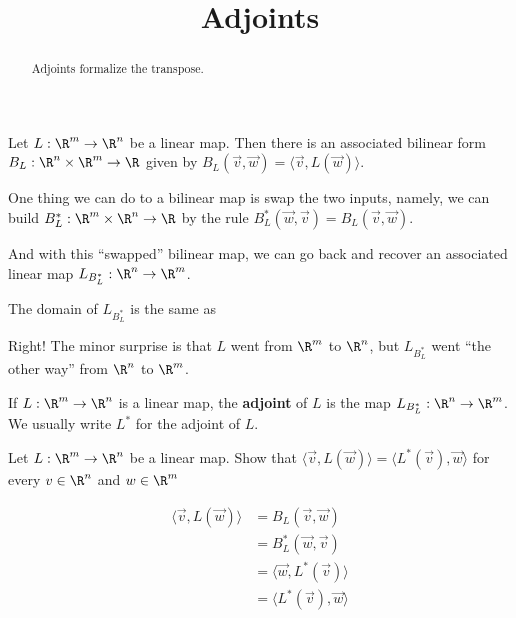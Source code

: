 \documentclass{ximera}
\title{Adjoints}
\begin{document}
\begin{abstract}
  Adjoints formalize the transpose.
\end{abstract}\maketitle
	
Let $L: \R^m \to \R^n$ be a linear map.  Then there is an associated
bilinear form $B_L : \R^n \times \R^m \to \R$ given by
$B_L(\vec{v},\vec{w}) = \langle \vec{v}, L(\vec{w}) \rangle$.

One thing we can do to a bilinear map is swap the two inputs, namely,
we can build $B_L^*: \R^m \times \R^n \to \R$ by the rule $B_L^*
(\vec{w},\vec{v}) = B_L(\vec{v},\vec{w})$.

And with this ``swapped'' bilinear map, we can go back and recover an
associated linear map $L_{B_L^*} : \R^n \to \R^m$.

\begin{question}
  The domain of $L_{B_L^*}$ is the same as
  \begin{solution}
    \begin{multiple-choice}
    \end{multiple-choice}
  \end{solution}

  Right! The minor surprise is that $L$ went from $\R^m$ to $\R^n$, but $L_{B_L^*}$ went ``the other way'' from $\R^n$ to $\R^m$.
\end{question}


\begin{definition}
  If $L:\R^m \to \R^n$ is a linear map, the \textbf{adjoint} of $L$ is
  the map $L_{B_L^*} : \R^n \to \R^m$.  We usually write $L^*$ for the
  adjoint of $L$.
\end{definition}
		
Let $L: \R^m \to \R^n$ be a linear map.  
Show that $\langle \vec{v}, L(\vec{w})\rangle = \langle  L^*(\vec{v}),\vec{w}\rangle$ for every $v \in \R^n$ and $w \in \R^m$
\begin{free-response}
  \begin{align*}
    \langle \vec{v}, L(\vec{w})\rangle &= B_L(\vec{v},\vec{w})\\
    &= B_L^*(\vec{w},\vec{v})\\
    &=\langle \vec{w},L^*(\vec{v}) \rangle\\
    &=\langle L^*(\vec{v}), \vec{w}\rangle
  \end{align*}
\end{free-response}
\end{document}
